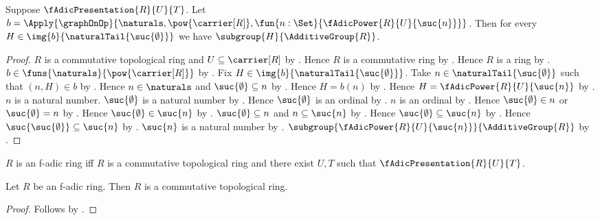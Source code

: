 \begin{theorem}\label{f_adic_presentation_tail_subgroups}
    Suppose $\fAdicPresentation{R}{U}{T}$.
    Let $b=\Apply{\graphOnOp}{
        \naturals,\pow{\carrier[R]},
        \fun{n:\Set}{\fAdicPower{R}{U}{\suc{n}}}}$.
    Then for every $H\in\img{b}{\naturalTail{\suc{\emptyset}}}$ we have
        $\subgroup{H}{\AdditiveGroup{R}}$.
\end{theorem}
\begin{proof}
    $R$ is a commutative topological ring and
        $U\subseteq\carrier[R]$ by .
    Hence $R$ is a commutative ring by
        .
    Hence $R$ is a ring by .
    $b\in\funs{\naturals}{\pow{\carrier[R]}}$ by
        .
    Fix $H\in\img{b}{\naturalTail{\suc{\emptyset}}}$.
    Take $n\in\naturalTail{\suc{\emptyset}}$ such that $(n,H)\in b$ by
        .
    Hence $n\in\naturals$ and $\suc{\emptyset}\subseteq n$ by
        .
    Hence $H=b(n)$ by .
    Hence $H=\fAdicPower{R}{U}{\suc{n}}$ by
        .
    $n$ is a natural number.
    $\suc{\emptyset}$ is a natural number by
        .
    Hence $\suc{\emptyset}$ is an ordinal by
        .
    $n$ is an ordinal by .
    Hence $\suc{\emptyset}\in n$ or $\suc{\emptyset}=n$ by
        .
    Hence $\suc{\emptyset}\in\suc{n}$ by .
    $\suc{\emptyset}\subseteq n$ and
        $n\subseteq\suc{n}$ by .
    Hence $\suc{\emptyset}\subseteq\suc{n}$ by
        .
    Hence $\suc{\suc{\emptyset}}\subseteq\suc{n}$ by
        .
    $\suc{n}$ is a natural number by .
    $\subgroup{\fAdicPower{R}{U}{\suc{n}}}{\AdditiveGroup{R}}$ by
        .
\end{proof}

\begin{definition}\label{f_adic_ring}
    $R$ is an f-adic ring iff
        $R$ is a commutative topological ring and
        there exist $U,T$ such that $\fAdicPresentation{R}{U}{T}$.
\end{definition}

\begin{proposition}\label{f_adic_ring_is_commutative_topological_ring}
    Let $R$ be an f-adic ring.
    Then $R$ is a commutative topological ring.
\end{proposition}
\begin{proof}
    Follows by .
\end{proof}

